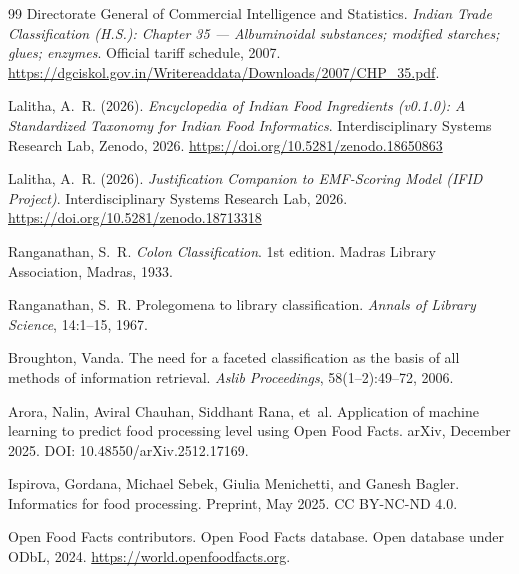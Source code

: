 \documentclass[12pt,a3paper]{article}
\begin{document}
\begin{thebibliography}{99}
{Directorate General of Commercial Intelligence and Statistics}.
\newblock \textit{Indian Trade Classification (H.S.): Chapter 35 --- Albuminoidal substances; modified starches; glues; enzymes}.
\newblock Official tariff schedule, 2007.
\newblock \url{https://dgciskol.gov.in/Writereaddata/Downloads/2007/CHP_35.pdf}.

Lalitha, A.~R. (2026).
\newblock \textit{Encyclopedia of Indian Food Ingredients (v0.1.0): A Standardized Taxonomy for Indian Food Informatics}.
\newblock Interdisciplinary Systems Research Lab, Zenodo, 2026.
\url{https://doi.org/10.5281/zenodo.18650863}

Lalitha, A.~R. (2026).
\newblock \textit{Justification Companion to EMF-Scoring Model (IFID Project)}. \newblock Interdisciplinary Systems Research Lab, 2026. \url{https://doi.org/10.5281/zenodo.18713318}


Ranganathan, S.~R.
\newblock \textit{Colon Classification}.
\newblock 1st edition. Madras Library Association, Madras, 1933.

Ranganathan, S.~R.
\newblock Prolegomena to library classification.
\newblock \textit{Annals of Library Science}, 14:1--15, 1967.

Broughton, Vanda.
\newblock The need for a faceted classification as the basis of all methods of information retrieval.
\newblock \textit{Aslib Proceedings}, 58(1--2):49--72, 2006.

Arora, Nalin, Aviral Chauhan, Siddhant Rana, et~al.
\newblock Application of machine learning to predict food processing level using Open Food Facts.
\newblock arXiv, December 2025.
\newblock DOI: 10.48550/arXiv.2512.17169.

Ispirova, Gordana, Michael Sebek, Giulia Menichetti, and Ganesh Bagler.
\newblock Informatics for food processing.
\newblock Preprint, May 2025. CC BY-NC-ND 4.0.

{Open Food Facts contributors}.
\newblock Open Food Facts database.
\newblock Open database under ODbL, 2024.
\newblock \url{https://world.openfoodfacts.org}.

\end{thebibliography}
\end{document}
